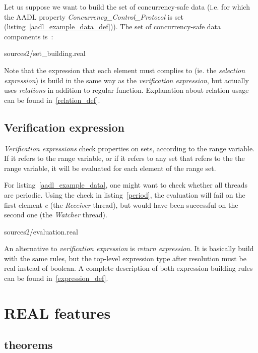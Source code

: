 \documentclass[a4paper,10pt]{article}
\newcommand{\aadl} {\textsc{AADL}}
\begin{document}
Let us suppose we want to build the set of concurrency-safe data
(i.e. for which the \aadl{} property
\textit{Concurrency\_Control\_Protocol} is set
(listing~\ref{aadl_example_data_def})). The set of concurrency-safe
data components is~:

\lstset{language=real}

                {sources2/set_building.real}
\label{set_building_real}

Note that the expression that each element must complies to (ie. 
the \textit{selection expression}) is build in the same way as the
\textit{verification expression}, but actually uses \textit{relations}
in addition to regular function. Explanation about relation usage can 
be found in~\ref{relation_def}.

\subsection{Verification expression}

\textit{Verification expressions} check properties on sets,
according to the range variable. If it refers to the range
variable, or if it refers to any set that refers to the the range
variable, it will be evaluated for each element of the range set.

For listing~\ref{aadl_example_data}, one might want to check whether
all threads are periodic. Using the check in listing~\ref{period}, the
evaluation will fail on the first element \textit{e} (the
\textit{Receiver} thread), but would have been successful on the
second one (the \textit{Watcher} thread).

\lstset{language=real}  {sources2/evaluation.real}

An alternative to \textit{verification expression} is \textit{return 
expression}. It is basically build with the same rules, but the 
top-level expression type after resolution must be real instead of 
boolean. A complete description of both expression building rules
can be found in~\ref{expression_def}.

\section {REAL features}

\subsection {theorems}
\end{document}
